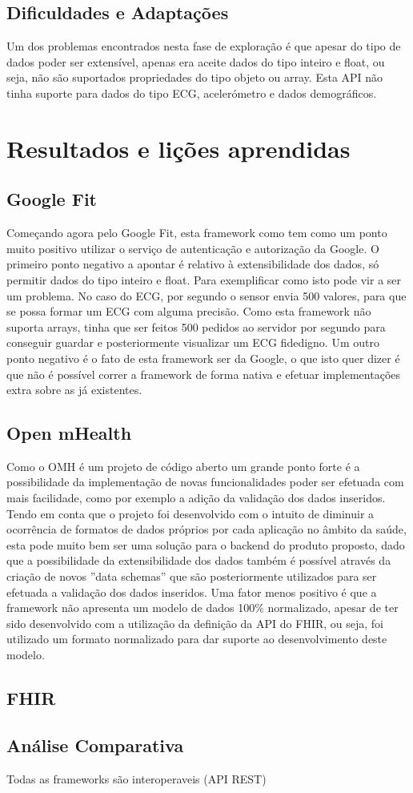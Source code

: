\subsection{Dificuldades e Adaptações}

Um dos problemas encontrados nesta fase de exploração é que apesar do tipo de dados poder ser extensível, apenas era aceite dados do tipo inteiro e float, ou seja, não são suportados propriedades do tipo objeto ou array. Esta \gls{API} não tinha suporte para dados do tipo \gls{ECG}, acelerómetro e dados demográficos.

\section{Resultados e lições aprendidas}
\subsection{Google Fit}
Começando agora pelo Google Fit, esta framework como tem como um ponto muito positivo utilizar o serviço de autenticação e autorização da Google. O primeiro ponto negativo a apontar é relativo à extensibilidade dos dados, só permitir dados do tipo inteiro e float. Para exemplificar como isto pode vir a ser um problema. No caso do \gls{ECG}, por segundo o sensor envia 500 valores, para que se possa formar um \gls{ECG} com alguma precisão. Como esta framework não suporta arrays, tinha que ser feitos 500 pedidos ao servidor por segundo para conseguir guardar e posteriormente visualizar um \gls{ECG} fidedigno. Um outro ponto negativo é o fato de esta framework ser da Google, o que isto quer dizer é que não é possível correr a framework de forma nativa e efetuar implementações extra sobre as já existentes.
\subsection{Open mHealth}
Como o \gls{OMH} é um projeto de código aberto um grande ponto forte é a possibilidade da implementação de novas funcionalidades poder ser efetuada com mais facilidade, como por exemplo a adição da validação dos dados inseridos. Tendo em conta que o projeto foi desenvolvido com o intuito de diminuir a ocorrência de formatos de dados próprios por cada aplicação no âmbito da saúde, esta pode muito bem ser uma solução para o backend do produto proposto, dado que a possibilidade da extensibilidade dos dados também é possível através da criação de novos ''data schemas'' que são posteriormente utilizados para ser efetuada a validação dos dados inseridos. 
Uma fator menos positivo é que a framework não apresenta um modelo de dados 100\% normalizado, apesar de ter sido desenvolvido com a utilização da definição da \gls{API} do \gls{FHIR}, ou seja, foi utilizado um formato normalizado para  dar suporte ao desenvolvimento deste modelo.

\subsection{FHIR}
\subsection{Análise Comparativa}
Todas as frameworks são interoperaveis (API REST)

\cleardoublepage